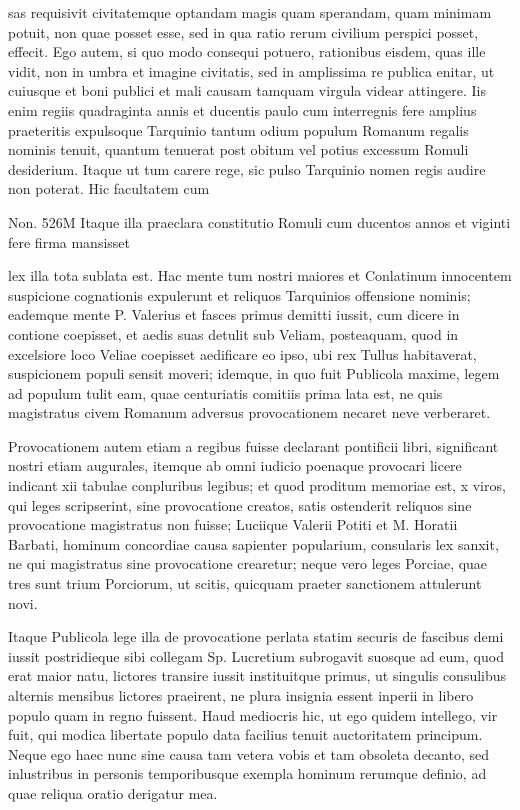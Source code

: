  sas requisivit civitatemque optandam magis quam sperandam, quam minimam potuit, non quae posset esse, sed in qua ratio rerum civilium perspici posset, effecit. Ego autem, si quo modo consequi potuero, rationibus eisdem, quas ille vidit, non in umbra et imagine civitatis, sed in amplissima re publica enitar, ut cuiusque et boni publici et mali causam tamquam virgula videar attingere. Iis enim regiis quadraginta annis et ducentis paulo cum interregnis fere amplius praeteritis expulsoque Tarquinio tantum odium populum Romanum regalis nominis tenuit, quantum tenuerat post obitum vel potius excessum Romuli desiderium. Itaque ut tum carere rege, sic pulso Tarquinio nomen regis audire non poterat. Hic facultatem cum

 Non. 526M Itaque illa praeclara constitutio Romuli cum ducentos annos et viginti fere firma mansisset

 lex illa tota sublata est. Hac mente tum nostri maiores et Conlatinum innocentem suspicione cognationis expulerunt et reliquos Tarquinios offensione nominis; eademque mente P. Valerius et fasces primus demitti iussit, cum dicere in contione coepisset, et aedis suas detulit sub Veliam, posteaquam, quod in excelsiore loco Veliae coepisset aedificare eo ipso, ubi rex Tullus habitaverat, suspicionem populi sensit moveri; idemque, in quo fuit Publicola maxime, legem ad populum tulit eam, quae centuriatis comitiis prima lata est, ne quis magistratus civem Romanum adversus provocationem necaret neve verberaret.

 Provocationem autem etiam a regibus fuisse declarant pontificii libri, significant nostri etiam augurales, itemque ab omni iudicio poenaque provocari licere indicant xii tabulae conpluribus legibus; et quod proditum memoriae est, x viros, qui leges scripserint, sine provocatione creatos, satis ostenderit reliquos sine provocatione magistratus non fuisse; Luciique Valerii Potiti et M. Horatii Barbati, hominum concordiae causa sapienter popularium, consularis lex sanxit, ne qui magistratus sine provocatione crearetur; neque vero leges Porciae, quae tres sunt trium Porciorum, ut scitis, quicquam praeter sanctionem attulerunt novi.

 Itaque Publicola lege illa de provocatione perlata statim securis de fascibus demi iussit postridieque sibi collegam Sp. Lucretium subrogavit suosque ad eum, quod erat maior natu, lictores transire iussit instituitque primus, ut singulis consulibus alternis mensibus lictores praeirent, ne plura insignia essent inperii in libero populo quam in regno fuissent. Haud mediocris hic, ut ego quidem intellego, vir fuit, qui modica libertate populo data facilius tenuit auctoritatem principum. Neque ego haec nunc sine causa tam vetera vobis et tam obsoleta decanto, sed inlustribus in personis temporibusque exempla hominum rerumque definio, ad quae reliqua oratio derigatur mea.

